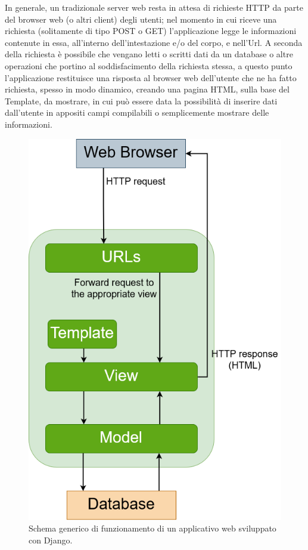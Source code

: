 In generale, un tradizionale server web resta in attesa di richieste HTTP da parte del browser web (o altri client) degli utenti; nel momento in cui riceve 
una richiesta (solitamente di tipo POST o GET) 
l'applicazione legge le informazioni contenute in essa, all'interno dell'intestazione e/o del corpo, e nell'Url. A seconda della richiesta è possibile che 
vengano letti o scritti dati da un database o altre operazioni che portino al soddisfacimento della richiesta stessa, a questo punto l'applicazione restituisce una 
risposta al browser web dell'utente che ne ha fatto richiesta, spesso in modo dinamico, creando una pagina HTML, sulla base del Template,
da mostrare, in cui può essere data la possibilità di inserire dati dall'utente in appositi campi compilabili o semplicemente mostrare delle informazioni.
%
\newpage
%
\begin{figure}[ht!]
    \centering
    \includegraphics[scale=0.3]{images/Django_doc.png}
    \caption{Schema generico di funzionamento di un applicativo web sviluppato con Django.}
    \label{fig:django_doc}
\end{figure}
